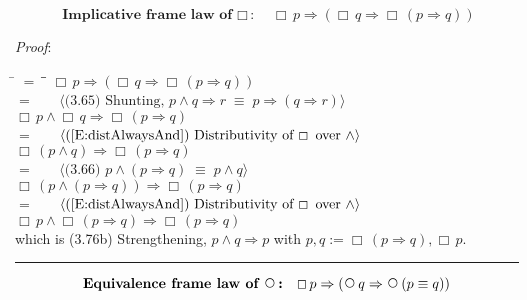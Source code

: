 \documentclass[12pt, fleqn, leqno]{article}
\newcommand{\lgap}{2pt}                             %
\newcommand{\mymathindent}{24pt}                    %
\newcommand{\equivs}{\ensuremath{\;\equiv\;}}       %
\newcommand{\impl}{\ensuremath{\Rightarrow}}        %
\newcommand{\Next}{\;\,\text{\raisebox{3.5pt}{\circle{6}}}}
\newcommand{\Always}{\Box\,}
\newcommand{\myqed}{\rule[-.23ex]{1.2ex}{2.0ex}}
\newcommand{\myqedtab}{\hspace{384pt}}              %
\newcommand{\Gll} {\langle}                         %
\newcommand{\Ggg} {\rangle}                         %
\newcommand{\Hint}[1]     {\ \ \ $\Gll              \mbox{#1} \Ggg$ }   %
\begin{document}
\begin{equation}\label{E:implframelawAlways}
\textbf{Implicative frame law of $\Always$:}\quad \Always p \impl (\Always q \impl \Always (p \impl q))
\end{equation}

\emph{Proof}: 
\begin{tabbing}
\hspace{\mymathindent} \= $= \;$ \= \myqedtab \= \kill
  \> \>   $\Always p \impl (\Always q \impl \Always (p \impl q))$\\[\lgap]
  \> $=$  \>  \Hint{(3.65) Shunting, $p\land q\impl r\equivs p\impl (q\impl r)$}\\[\lgap]
  \> \>   $\Always p \land \Always q \impl \Always (p \impl q)$\\[\lgap]
  \> $=$  \>  \Hint{(\ref{E:distAlwaysAnd}) Distributivity of $\Always$ over $\land$}\\[\lgap]
  \> \>   $\Always (p \land q) \impl \Always (p \impl q)$\\[\lgap]
  \> $=$  \>  \Hint{(3.66) $p\land (p\impl q) \equivs p\land q$}\\[\lgap]
  \> \>   $\Always (p \land (p \impl q)) \impl \Always (p \impl q)$\\[\lgap]
  \> $=$  \>  \Hint{(\ref{E:distAlwaysAnd}) Distributivity of $\Always$ over $\land$}\\[\lgap]
  \> \>   $\Always p \land \Always (p \impl q) \impl \Always (p \impl q)$\\[\lgap]
   \> which is (3.76b) Strengthening, $p\land q \impl p$ with $p, q :=\Always (p \impl q) ,\Always p$. \quad \myqed
\end{tabbing}

\begin{equation}\label{E:equivframelawnext}
\textbf{Equivalence frame law of $\Next$:}\quad \Always p \impl (\Next q \impl \Next (p \equiv q))
\end{equation}
\end{document}
